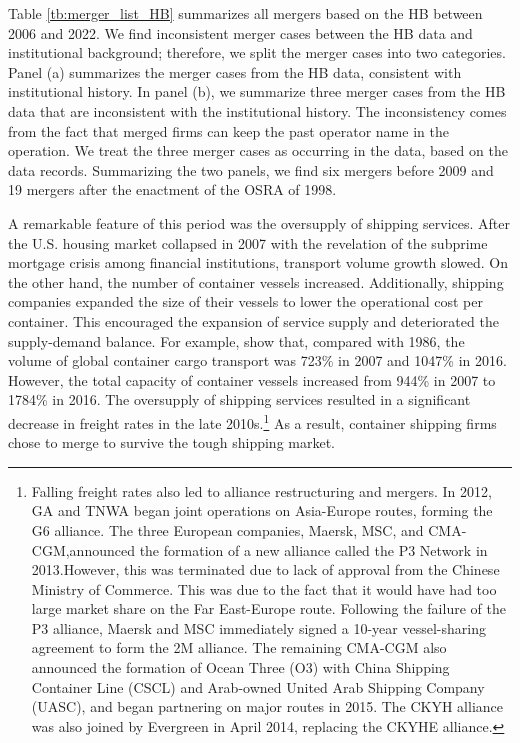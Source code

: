 \documentclass[10pt]{article}
\begin{document}
Table \ref{tb:merger_list_HB} summarizes all mergers based on the HB between 2006 and 2022. 
We find inconsistent merger cases between the HB data and institutional background; therefore, we split the merger cases into two categories.
Panel (a) summarizes the merger cases from the HB data, consistent with institutional history.
In panel (b), we summarize three merger cases from the HB data that are inconsistent with the institutional history.
The inconsistency comes from the fact that merged firms can keep the past operator name in the operation. 
We treat the three merger cases as occurring in the data, based on the data records.
Summarizing the two panels, we find six mergers before 2009 and 19 mergers after the enactment of the OSRA of 1998.

A remarkable feature of this period was the oversupply of shipping services.
After the U.S. housing market collapsed in 2007 with the revelation of the subprime mortgage crisis among financial institutions, transport volume growth slowed. 
On the other hand, the number of container vessels increased. 
Additionally, shipping companies expanded the size of their vessels to lower the operational cost per container.
This encouraged the expansion of service supply and deteriorated the supply-demand balance.
For example, \cite{matsuda2022} show that, compared with 1986, the volume of global container cargo transport was 723\% in 2007 and 1047\% in 2016. However, the total capacity of container vessels increased from 944\% in 2007 to 1784\% in 2016.
The oversupply of shipping services resulted in a significant decrease in freight rates in the late 2010s.\footnote{Falling freight rates also led to alliance restructuring and mergers. In 2012, GA and TNWA began joint operations on Asia-Europe routes, forming the G6 alliance. 
The three European companies, Maersk, MSC, and CMA-CGM,announced the formation of a new alliance called the P3 Network in 2013.However, this was terminated due to lack of approval from the Chinese Ministry of Commerce. This was due to the fact that it would have had too large market share on the Far East-Europe route. 
Following the failure of the P3 alliance, Maersk and MSC immediately signed a 10-year vessel-sharing agreement to form the 2M alliance. The remaining CMA-CGM also announced the formation of Ocean Three (O3) with China Shipping Container Line (CSCL) and Arab-owned United Arab Shipping Company (UASC), and began partnering on major routes in 2015. The CKYH alliance was also joined by Evergreen in April 2014, replacing the CKYHE alliance.} As a result, container shipping firms chose to merge to survive the tough shipping market.
\end{document}
